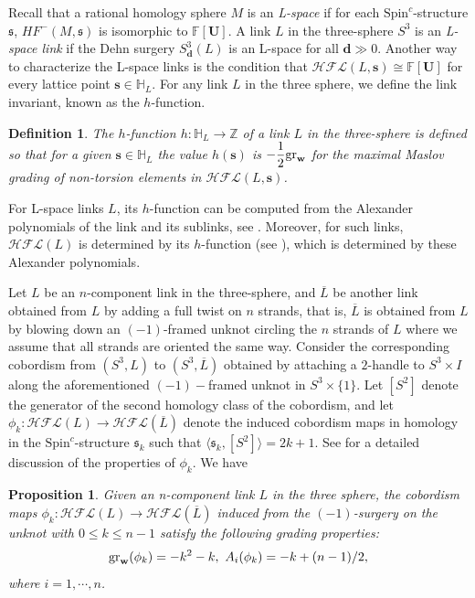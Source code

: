 \documentclass[10pt,a4paper]{amsart}
\newtheorem{proposition}[theorem]{Proposition}
\newtheorem{definition}[theorem]{Definition}
\newcommand{\F}{\mathbb{F}}
\newcommand{\cHFL}{\mathcal{H\!F\! L}}
\newcommand{\Spin}{\text{Spin}^{c}}
\newcommand{\w}{\mathbf{w}}
\newcommand{\spinc}{\text{Spin}^{c}}
\def\gr{\textup{gr}}
\def\w{{\bf{w}}}
\newcommand{\HH}{\mathbb{H}}
\newcommand{\Z}{\mathbb{Z}}
\newcommand{\UU}{\mathbf{U}}
\renewcommand{\ss}{\mathbf{s}}
\begin{document}
Recall that a rational homology sphere $M$ is an \emph{L-space} if for each $\Spin$-structure $\mathfrak{s}$,  $HF^-(M, \mathfrak{s})$ is isomorphic to $\F[\UU]$. A link $L$ in the three-sphere $S^3$ is an \emph{L-space link} if the Dehn surgery $S^3_{\mathbf{d}}(L)$ is an L-space for all $\mathbf{d}\gg 0$. Another way to characterize the L-space links is the condition that $\cHFL(L, \ss)\cong \F[\UU]$ for every lattice point $\ss\in \HH_L$. For any link $L$ in the three sphere, we define the link invariant,  known as the $h$-function.

\begin{definition}
    The $h$-function $h:\HH_L\to \Z$ of a link $L$ in the three-sphere is defined so that  for a given $\ss\in \HH_L$ the value $h(\ss)$ is  $-\dfrac{1}{2} \gr_{\w}$ for the maximal Maslov grading of non-torsion elements in $\cHFL(L, \ss)$. 
\end{definition}

For L-space links $L$, its $h$-function can be computed from the Alexander polynomials of the link and its sublinks, see \cite{BorodzikGorskyImmersed}. Moreover, for such links, $\cHFL(L)$ is determined by its $h$-function (see \cite{BLZ}), which is determined by these Alexander polynomials. 

Let $L$ be an $n$-component link in the three-sphere, and $\overline{L}$ be another link obtained from $L$ by 
adding a full twist on $n$ strands, that is, $\overline{L}$ is  obtained from $L$ by blowing down an $(-1)$-framed unknot circling the $n$ strands of $L$ where we assume that all strands are oriented the same way. Consider the corresponding cobordism from $(S^3, L)$ to $(S^3, \overline{L})$ obtained by attaching a $2$-handle to $S^3\times I$ along the aforementioned $(-1)-$framed unknot in $S^3\times\{1\}$. Let $[S^2]$ denote the generator of the second homology class of the cobordism, and let $\phi_k:\cHFL(L)\to \cHFL(\overline{L})$ denote the induced cobordism maps in homology in the $\spinc$-structure $\mathfrak{s}_k$ such that  $\langle \mathfrak{s}_k, [S^2]\rangle =2k+1$.  See \cite{AGL} for a detailed discussion of the properties of $\phi_k$.  We have

\begin{proposition}\cite{AGL}\label{prop:gradingshifts}
Given an n-component link $L$ in the three sphere, the cobordism maps $\phi_k:\cHFL(L)\to\cHFL(\overline{L}) $ induced from the $(-1)$-surgery on the unknot with $0\leq k\leq n-1$ satisfy the following grading properties:
$$
\gr_{\w}(\phi_k)=-k^2-k,\ A_i(\phi_k)=-k+(n-1)/2,
$$
where $i=1, \cdots, n$. 
\end{proposition}
\end{document}
